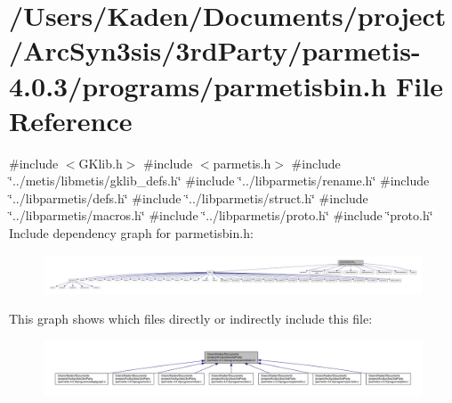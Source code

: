 \hypertarget{a00431}{}\section{/\+Users/\+Kaden/\+Documents/project/\+Arc\+Syn3sis/3rd\+Party/parmetis-\/4.0.3/programs/parmetisbin.h File Reference}
\label{a00431}
{\ttfamily \#include $<$G\+Klib.\+h$>$}\newline
{\ttfamily \#include $<$parmetis.\+h$>$}\newline
{\ttfamily \#include \char`\"{}../metis/libmetis/gklib\+\_\+defs.\+h\char`\"{}}\newline
{\ttfamily \#include \char`\"{}../libparmetis/rename.\+h\char`\"{}}\newline
{\ttfamily \#include \char`\"{}../libparmetis/defs.\+h\char`\"{}}\newline
{\ttfamily \#include \char`\"{}../libparmetis/struct.\+h\char`\"{}}\newline
{\ttfamily \#include \char`\"{}../libparmetis/macros.\+h\char`\"{}}\newline
{\ttfamily \#include \char`\"{}../libparmetis/proto.\+h\char`\"{}}\newline
{\ttfamily \#include \char`\"{}proto.\+h\char`\"{}}\newline
Include dependency graph for parmetisbin.\+h\+:\nopagebreak
\begin{figure}[H]
\begin{center}
\leavevmode
\includegraphics[width=350pt]{a00432}
\end{center}
\end{figure}
This graph shows which files directly or indirectly include this file\+:\nopagebreak
\begin{figure}[H]
\begin{center}
\leavevmode
\includegraphics[width=350pt]{a00433}
\end{center}
\end{figure}
